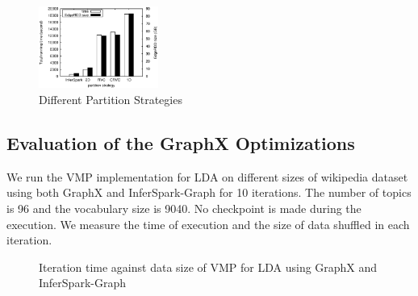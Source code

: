 \begin{figure}[h]\centering
	\includegraphics[width=0.35\textwidth]{figs/exp_partition_strategy.eps}
	\caption{Different Partition Strategies}
	\label{fig:exp_partition_strategy}
\end{figure}

\subsection{Evaluation of the GraphX Optimizations}

We run the VMP implementation for LDA on different sizes of wikipedia dataset
using both GraphX and InferSpark-Graph for 10 iterations. The number of topics
is 96 and the vocabulary size is 9040. No checkpoint is made during the
execution. We measure the time of execution and the size of data shuffled in
each iteration.

\begin{figure}[h]
\centering
	\caption{Iteration time against data size of VMP for LDA using GraphX and
	InferSpark-Graph}
	\label{fig:graph_cmp_iteration_time_datasize}
\end{figure}

